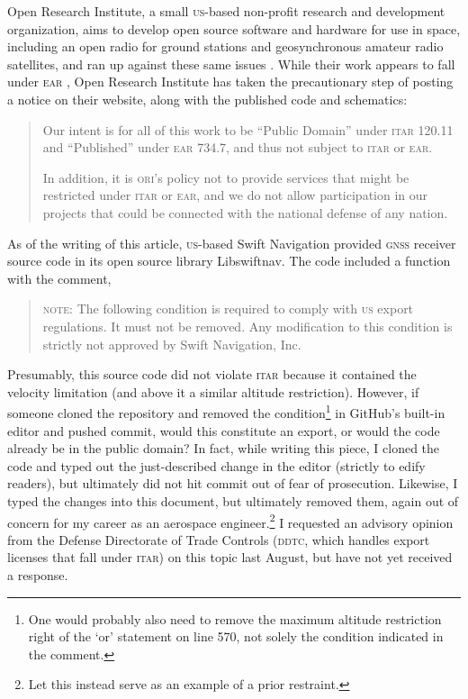\documentclass[preprint,twocolumn,5p]{elsarticle}
\begin{document}
Open Research Institute, a small \textsc{us}-based non-profit research and development organization, aims to develop open source software and hardware for use in space, including an open radio for ground stations and geosynchronous amateur radio satellites, and ran up against these same issues \citep{ORIBlog}. While their work appears to fall under \textsc{ear} \citep{ORIDDTC}, Open Research Institute has taken the precautionary step of posting a notice on their website, along with the published code and schematics:
\begin{quote}
Our intent is for all of this work to be ``Public Domain'' under \textsc{itar} 120.11 and ``Published'' under \textsc{ear} 734.7, and thus not subject to \textsc{itar} or \textsc{ear}.

In addition, it is \textsc{ori}'s policy not to provide services that might be restricted under \textsc{itar} or \textsc{ear}, and we do not allow participation in our projects that could be connected with the national defense of any nation. \citep{ORIStatement}
\end{quote}

As of the writing of this article, \textsc{us}-based Swift Navigation provided \textsc{gnss} receiver source code in its open source library Libswiftnav. The code included a function with the comment,
\begin{quote}
\textsc{note}: The following condition is required to comply with \textsc{us} export regulations. It must not be removed. Any modification to this condition is strictly not approved by Swift Navigation, Inc. \citep{Libswiftnav575}
\end{quote}
Presumably, this source code did not violate \textsc{itar} because it contained the velocity limitation (and above it a similar altitude restriction). However, if someone cloned the repository and removed the condition\footnote{One would probably also need to remove the maximum altitude restriction right of the `or' statement on line 570, not solely the condition indicated in the comment.} in GitHub's built-in editor and pushed commit, would this constitute an export, or would the code already be in the public domain? In fact, while writing this piece, I cloned the code and typed out the just-described change in the editor (strictly to edify readers), but ultimately did not hit commit out of fear of prosecution. Likewise, I typed the changes into this document, but ultimately removed them, again out of concern for my career as an aerospace engineer.\footnote{Let this instead serve as an example of a prior restraint.} I requested an advisory opinion from the Defense Directorate of Trade Controls (\textsc{ddtc}, which handles export licenses that fall under \textsc{itar}) on this topic last August, but have not yet received a response.
\end{document}
